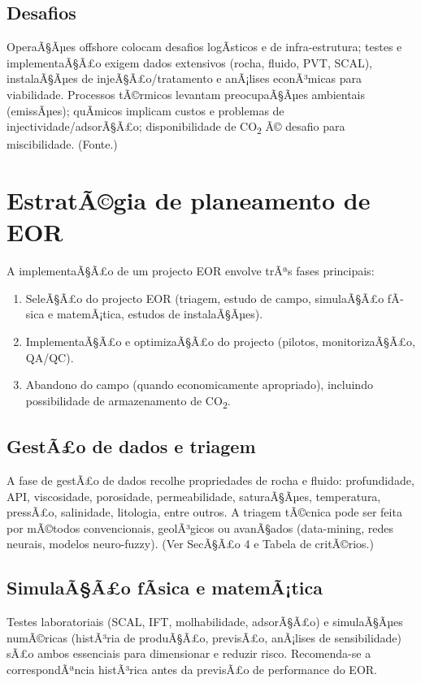 \documentclass[11pt,a4paper]{article}
\begin{document}
\subsection{Desafios}
OperaÃ§Ãµes offshore colocam desafios logÃ­sticos e de infra-estrutura; testes e implementaÃ§Ã£o exigem dados extensivos (rocha, fluido, PVT, SCAL), instalaÃ§Ãµes de injeÃ§Ã£o/tratamento e anÃ¡lises econÃ³micas para viabilidade. Processos tÃ©rmicos levantam preocupaÃ§Ãµes ambientais (emissÃµes); quÃ­micos implicam custos e problemas de injectividade/adsorÃ§Ã£o; disponibilidade de CO\textsubscript{2} Ã© desafio para miscibilidade. (Fonte.)

\section{EstratÃ©gia de planeamento de EOR}
A implementaÃ§Ã£o de um projecto EOR envolve trÃªs fases principais:
\begin{enumerate}
  \item SeleÃ§Ã£o do projecto EOR (triagem, estudo de campo, simulaÃ§Ã£o fÃ­sica e matemÃ¡tica, estudos de instalaÃ§Ãµes).
  \item ImplementaÃ§Ã£o e optimizaÃ§Ã£o do projecto (pilotos, monitorizaÃ§Ã£o, QA/QC).
  \item Abandono do campo (quando economicamente apropriado), incluindo possibilidade de armazenamento de CO\textsubscript{2}.
\end{enumerate}

\subsection{GestÃ£o de dados e triagem}
A fase de gestÃ£o de dados recolhe propriedades de rocha e fluido: profundidade, API, viscosidade, porosidade, permeabilidade, saturaÃ§Ãµes, temperatura, pressÃ£o, salinidade, litologia, entre outros. A triagem tÃ©cnica pode ser feita por mÃ©todos convencionais, geolÃ³gicos ou avanÃ§ados (data-mining, redes neurais, modelos neuro-fuzzy). (Ver SecÃ§Ã£o 4 e Tabela de critÃ©rios.)

\subsection{SimulaÃ§Ã£o fÃ­sica e matemÃ¡tica}
Testes laboratoriais (SCAL, IFT, molhabilidade, adsorÃ§Ã£o) e simulaÃ§Ãµes numÃ©ricas (histÃ³ria de produÃ§Ã£o, previsÃ£o, anÃ¡lises de sensibilidade) sÃ£o ambos essenciais para dimensionar e reduzir risco. Recomenda-se a correspondÃªncia histÃ³rica antes da previsÃ£o de performance do EOR.
\end{document}
